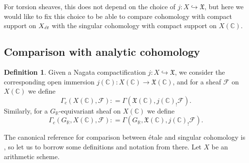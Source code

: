 \documentclass[leqno,12pt]{article}
\theoremstyle{plain}
\theoremstyle{definition}
\newtheorem{definition}[theorem]{\indent\sc Definition}
\newcommand{\CC}{\mathbb{C}}
\newcommand{\RR}{\mathbb{R}}
\newcommand{\dfn}{\mathrel{\mathop:}=}
\newcommand{\et}{\text{\it \'{e}t}}
\begin{document}
For torsion sheaves, this does not depend on the choice of
$j\colon X \hookrightarrow \mathfrak{X}$, but here we would like to fix this
choice to be able to compare cohomology with compact support on $X_\et$ with
the singular cohomology with compact support on $X (\CC)$.

\subsection*{Comparison with analytic cohomology}

\begin{definition}
  Given a Nagata compactification $j\colon X\hookrightarrow \mathfrak{X}$,
  we consider the corresponding open immersion
  $j (\CC)\colon X (\CC) \to \mathfrak{X} (\CC)$,
  and for a sheaf $\mathcal{F}$ on $X (\CC)$ we define
  \[ \Gamma_c (X (\CC), \mathcal{F}) \dfn
  \Gamma (\mathfrak{X} (\CC), j (\CC)_! \mathcal{F}). \]
  Similarly, for a $G_\RR$-equivariant sheaf on $X (\CC)$ we define
  \[ \Gamma_c (G_\RR, X (\CC), \mathcal{F}) \dfn
  \Gamma (G_\RR, \mathfrak{X} (\CC), j (\CC)_! \mathcal{F}). \]
\end{definition}

The canonical reference for comparison between \'{e}tale and singular cohomology
is \cite[Expos\'{e}~XI, \S 4]{SGA4}, so let us to borrow some definitions and
notation from there. Let $X$ be an arithmetic scheme.
\end{document}
